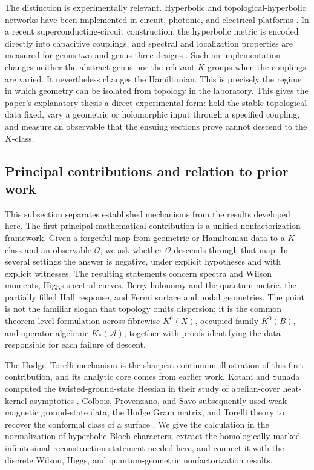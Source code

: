 \documentclass[11pt]{article}
\theoremstyle{definition}
\theoremstyle{remark}
\begin{document}
The distinction is experimentally relevant.  Hyperbolic and
topological-hyperbolic networks have been implemented in circuit,
photonic, and electrical platforms
\cite{KollarFitzpatrickHouck,YuPiaoPark,ZhangEtAl2022}.  In a recent
superconducting-circuit construction, the hyperbolic metric is encoded
directly into capacitive couplings, and spectral and localization properties
are measured for genus-two and genus-three designs \cite{XuEtAl2025}.  Such an
implementation changes neither the abstract genus nor the relevant
\(K\)-groups when the couplings are varied.  It nevertheless changes the
Hamiltonian.  This is precisely the regime in which geometry can be isolated
from topology in the laboratory.  This gives the paper's explanatory thesis
a direct experimental form: hold the stable topological data fixed, vary a
geometric or holomorphic input through a specified coupling, and measure an
observable that the ensuing sections prove cannot descend to the
\(K\)-class.

\subsection{Principal contributions and relation to prior work}

This subsection separates established mechanisms from the results developed
here.  The first principal mathematical contribution is a unified
nonfactorization framework.  Given a forgetful map from geometric or
Hamiltonian data to a \(K\)-class and an observable \(\mathcal O\), we ask
whether \(\mathcal O\) descends through that map.  In several settings the
answer is negative, under explicit hypotheses and with explicit witnesses.
The resulting statements concern spectra and Wilson moments, Higgs spectral
curves, Berry holonomy and the quantum metric, the partially filled Hall response,
and Fermi surface and nodal geometries.  The point is not the familiar slogan
that topology omits dispersion; it is the common theorem-level formulation
across fibrewise \(K^0(X)\), occupied-family \(K^0(B)\), and
operator-algebraic \(K_*(\mathcal A)\), together with proofs identifying the
data responsible for each failure of descent.

The Hodge--Torelli mechanism is the sharpest continuum illustration of this
first contribution, and its analytic core comes from earlier work.  Kotani
and Sunada computed the twisted-ground-state Hessian in their study of
abelian-cover heat-kernel asymptotics \cite{KotaniSunada2000}.  Colbois,
Provenzano, and Savo subsequently used weak magnetic ground-state data, the
Hodge Gram matrix, and Torelli theory to recover the conformal class of a
surface \cite{ColboisProvenzanoSavo2025}.  We give the calculation in the
normalization of hyperbolic Bloch characters, extract the homologically
marked infinitesimal reconstruction statement needed here, and connect it
with the discrete Wilson, Higgs, and quantum-geometric nonfactorization
results.
\end{document}
